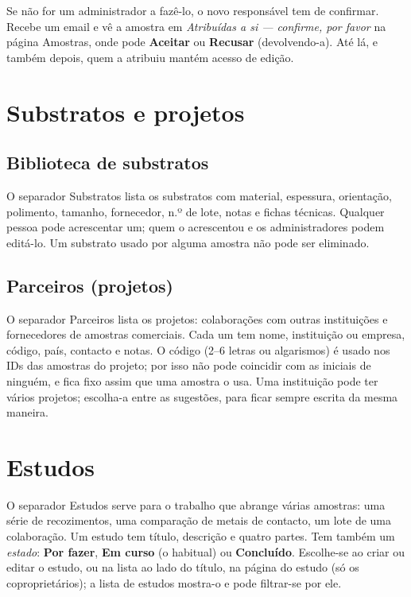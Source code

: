\documentclass[11pt,a4paper]{article}
\newcommand{\ui}[1]{\textsf{\textbf{#1}}}
\newcommand{\menu}[1]{\textsf{#1}}
\begin{document}
Se não for um administrador a fazê-lo, o novo responsável tem de
confirmar. Recebe um email e vê a amostra em \emph{Atribuídas a si ---
confirme, por favor} na página \menu{Amostras}, onde pode \ui{Aceitar} ou
\ui{Recusar} (devolvendo-a). Até lá, e também depois, quem a atribuiu
mantém acesso de edição.

\section{Substratos e projetos}

\subsection{Biblioteca de substratos}

O separador \menu{Substratos} lista os substratos com material, espessura,
orientação, polimento, tamanho, fornecedor, n.º de lote, notas e fichas técnicas.
Qualquer pessoa pode acrescentar um; quem o acrescentou e os
administradores podem editá-lo. Um substrato usado por alguma amostra não
pode ser eliminado.

\subsection{Parceiros (projetos)}

O separador \menu{Parceiros} lista os projetos: colaborações com outras
instituições e fornecedores de amostras comerciais. Cada um tem nome,
instituição ou empresa, código, país, contacto e notas. O código (2--6 letras ou
algarismos) é usado nos IDs das amostras do projeto; por isso não pode
coincidir com as iniciais de ninguém, e fica fixo assim que uma amostra o
usa. Uma instituição pode ter vários projetos; escolha-a entre as
sugestões, para ficar sempre escrita da mesma maneira.

\section{Estudos}\label{sec:studies}

O separador \menu{Estudos} serve para o trabalho que abrange várias
amostras: uma série de recozimentos, uma comparação de metais de contacto,
um lote de uma colaboração. Um estudo tem título, descrição e quatro partes.
Tem também um \emph{estado}: \ui{Por fazer}, \ui{Em curso} (o habitual) ou
\ui{Concluído}. Escolhe-se ao criar ou editar o estudo, ou na lista ao lado
do título, na página do estudo (só os coproprietários); a lista de estudos
mostra-o e pode filtrar-se por ele.
\end{document}
